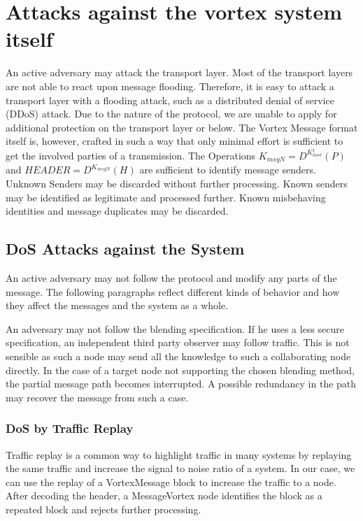 \section{Attacks against the vortex system itself}
An active adversary may attack the transport layer. Most of the transport layers are not able to react upon message flooding. Therefore, it is easy to attack a transport layer with a flooding attack, such as a distributed denial of service (DDoS) attack. Due to the nature of the protocol, we are unable to apply for additional protection on the transport layer or below. The Vortex Message format itself is, however, crafted in such a way that only minimal effort is sufficient to get the involved parties of a transmission. The Operations $ K_{msgN}=D^{K^{1}_{host}}\left(P\right)$ and $HEADER=D^{K_{msgN}}\left(H\right)$ are sufficient to identify message senders. Unknown Senders may be discarded without further processing. Known senders may be identified as legitimate and processed further. Known misbehaving identities and message duplicates may be discarded. 

\subsection{DoS Attacks against the System}
An active adversary may not follow the protocol and modify any parts of the message. The following paragraphs reflect different kinds of behavior and how they affect the messages and the system as a whole.

An adversary may not follow the blending specification. If he uses a less secure specification, an independent third party observer may follow traffic. This is not sensible as such a node may send all the knowledge to such a collaborating node directly. In the case of a  target node not supporting the chosen blending method, the partial message path becomes interrupted. A possible redundancy in the path may recover the message from such a case.

\subsubsection{DoS by Traffic Replay}
Traffic replay is a common way to highlight traffic in many systems by replaying the same traffic and increase the signal to noise ratio of a system. In our case, we can use the replay of a VortexMessage block to increase the traffic to a node. After decoding the header, a MessageVortex node identifies the block as a repeated block and rejects further processing. 


